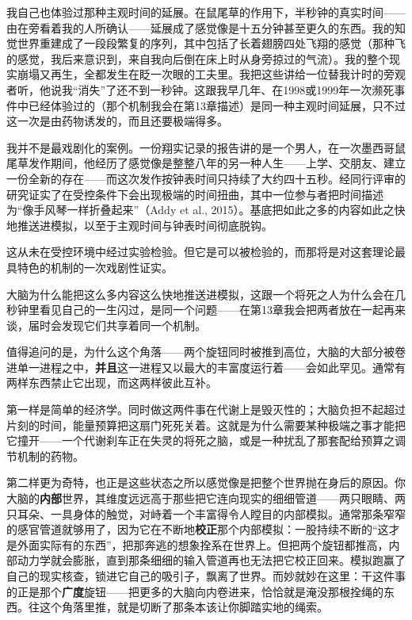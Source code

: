 \documentclass[11pt, twoside, openright]{book}
\begin{document}
我自己也体验过那种主观时间的延展。在鼠尾草的作用下，半秒钟的真实时间------由在旁看着我的人所确认------延展成了感觉像是十五分钟甚至更久的东西。我的知觉世界重建成了一段段繁复的序列，其中包括了长着翅膀四处飞翔的感觉（那种飞的感觉，我后来意识到，来自我向后倒在床上时从身旁掠过的气流）。我的整个现实崩塌又再生，全都发生在眨一次眼的工夫里。我把这些讲给一位替我计时的旁观者听，他说我“消失”了还不到一秒钟。这跟我早几年、在1998或1999年一次濒死事件中已经体验过的（那个机制我会在第13章描述）是同一种主观时间延展，只不过这一次是由药物诱发的，而且还要极端得多。

我并不是最戏剧化的案例。一份翔实记录的报告讲的是一个男人，在一次墨西哥鼠尾草发作期间，他经历了感觉像是整整八年的另一种人生------上学、交朋友、建立一份全新的存在------而这次发作按钟表时间只持续了大约四十五秒。经同行评审的研究证实了在受控条件下会出现极端的时间扭曲，其中一位参与者把时间描述为“像手风琴一样折叠起来”（Addy et al., 2015）。基底把如此之多的内容如此之快地推送进模拟，以至于主观时间与钟表时间彻底脱钩。

这从未在受控环境中经过实验检验。但它是可以被检验的，而那将是对这套理论最具特色的机制的一次戏剧性证实。

大脑为什么能把这么多内容这么快地推送进模拟，这跟一个将死之人为什么会在几秒钟里看见自己的一生闪过，是同一个问题------在第13章我会把两者放在一起再来谈，届时会发现它们共享着同一个机制。

值得追问的是，为什么这个角落------两个旋钮同时被推到高位，大脑的大部分被卷进单一进程之中，\textbf{并且}这一进程又以最大的丰富度运行着------会如此罕见。通常有两样东西禁止它出现，而这两样彼此互补。

第一样是简单的经济学。同时做这两件事在代谢上是毁灭性的；大脑负担不起超过片刻的时间，能量预算把这扇门死死关着。这就是为什么需要某种极端之事才能把它撞开------一个代谢刹车正在失灵的将死之脑，或是一种扰乱了那套配给预算之调节机制的药物。

第二样更为奇特，也正是这些状态之所以感觉像是把整个世界抛在身后的原因。你大脑的\textbf{内部}世界，其维度远远高于那些把它连向现实的细细管道------两只眼睛、两只耳朵、一具身体的触觉，对峙着一个丰富得令人瞠目的内部模拟。通常那条窄窄的感官管道就够用了，因为它在不断地\textbf{校正}那个内部模拟：一股持续不断的“这才是外面实际有的东西”，把那奔逃的想象拴系在世界上。但把两个旋钮都推高，内部动力学就会膨胀，直到那条细细的输入管道再也无法把它校正回来。模拟跑赢了自己的现实核查，锁进它自己的吸引子，飘离了世界。而妙就妙在这里：干这件事的正是那个\textbf{广度}旋钮------把更多的大脑向内卷进来，恰恰就是淹没那根拴绳的东西。往这个角落里推，就是切断了那条本该让你脚踏实地的绳索。
\end{document}
